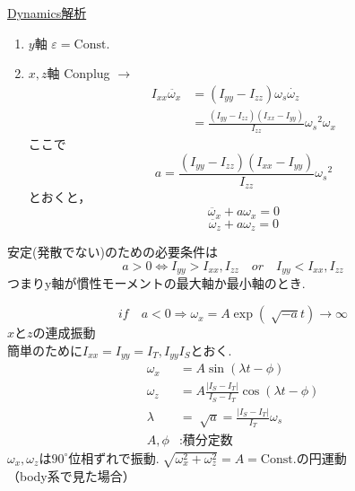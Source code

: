 \documentclass[class=article, crop=false, dvipdfmx]{standalone}
\begin{document}
\noindent
\underline{Dynamics解析}
\begin{enumerate}[label=\theenumi)]
\item $y$軸 \qquad $\varepsilon = \mathrm{Const.}$
\item $x, z$軸 \quad Conplug $\rightarrow$ 
	\begin{align}
    I_{xx} \ddot{\omega_x} & = (I_{yy} - I_{zz})\omega_s \dot{\omega_z} \\
    		&= \frac{(I_{yy}-I_{zz})(I_{xx}-I_{yy})}{I_{zz}} {\omega_s}^2 \omega_x
    \end{align}
    ここで
    \[ a = \frac{(I_{yy}-I_{zz})(I_{xx}-I_{yy})}{I_{zz}} {\omega_s}^2 \]
    とおくと，
    \[ \ddot{\omega_x} + a\omega_x = 0 \]
    \[ \ddot{\omega_z} + a\omega_z = 0 \]
\end{enumerate}
安定(発散でない)のための必要条件は
\begin{equation}
a>0\Leftrightarrow I_{yy}>I_{xx},I_{zz}\quad or \quad I_{yy}
< I_{xx}, I_{zz}
\end{equation}
つまりy軸が慣性モーメントの最大軸か最小軸のとき.

\begin{minipage}{0.45\linewidth}

\end{minipage}
\begin{minipage}{0.3\linewidth}

\end{minipage}


\begin{equation}
if\quad a<0 \Rightarrow
\omega_x=
A\exp(\sqrt[]{-a}t)\rightarrow\infty
\end{equation}
$x$と$z$の連成振動\\
簡単のために$I_{xx} = I_{yy}=I_T,I_{yy}I_S$とおく.\\
\begin{align}
\omega_x&=A\sin(\lambda t-\phi)\\
\omega_z&=A\frac{|I_S-I_T|}{I_S-I_T}
\cos(\lambda t-\phi)\\
\lambda&=\sqrt[]{a}=\frac{|I_S-I_T|}{I_T}\omega_s\\
A,\phi&:\text{積分定数}
\end{align}
$\omega_x,\omega_z$は$90^\circ$位相ずれで振動.$\sqrt[]{\omega_x^2+\omega_z^2}=A=\mathrm{Const.}$の円運動\\


\noindent
（body系で見た場合）\\
\begin{center}
\begin{minipage}{0.45\linewidth}

\end{minipage}
\hspace{3zw}
\begin{minipage}{0.45\linewidth}

\end{minipage}
\end{center}
\vspace{\baselineskip}
\end{document}
